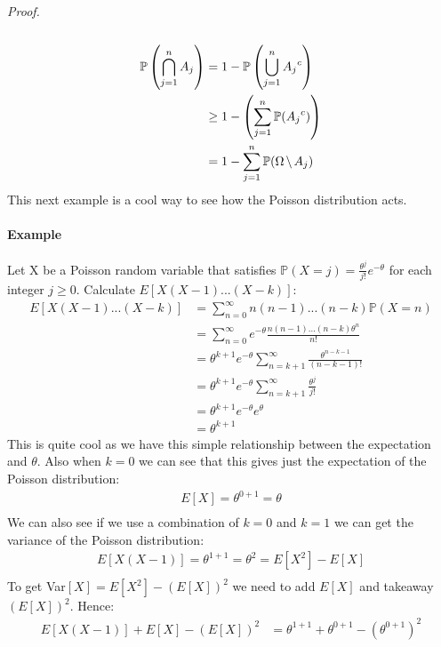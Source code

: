 \documentclass[,oneside]{article}
\begin{document}
\begin{enumerate}
\textit{Proof.}\\ \\
\begin{align*}
\mathbb{P} \left ( \bigcap_{j=1}^{n} A_j \right ) &= 1-\mathbb{P}\left ( \bigcup_{j=1}^{n} {A_j}^c \right )\\
&\geq 1- \left ( \sum_{j=1}^{n} \mathbb{P}({A_j}^c ) \right )\\
&= 1-  \sum_{j=1}^{n}   \mathbb{P}( \Omega \hspace{0.05cm} \backslash \hspace{0.05cm} A_j )\\
\end{align*}
This next example is a cool way to see how the Poisson distribution acts. \\ \\
\textbf{Example}\\ \\
Let X be a Poisson random variable that satisfies $\mathbb{P}(X=j)=\frac{\theta^j}{j!}e^{-\theta}$ for each integer $j \geq 0$. Calculate $E[X(X-1)...(X-k)]$:
\begin{align*}
E[X(X-1)...(X-k)]&=\sum_{n=0}^{\infty}n(n-1)...(n-k)\mathbb{P}(X=n)\\
&= \sum_{n=0}^{\infty}e^{-\theta}\frac{n(n-1)...(n-k)\theta^n}{n!}\\
&= \theta^{k+1} e^{-\theta} \sum_{n=k+1}^{\infty}\frac{\theta^{n-k-1}}{(n-k-1)!}\\
&= \theta^{k+1} e^{-\theta}\sum_{n=k+1}^{\infty} \frac{\theta^j}{j!}\\
&= \theta^{k+1} e^{-\theta} e^\theta \\
&= \theta^{k+1}
\end{align*}
This is quite cool as we have this simple relationship between the expectation and $\theta$. Also when $k=0$ we can see that this gives just the expectation of the Poisson distribution:
\begin{align*}
E[X]=\theta^{0+1}=\theta\\
\end{align*}
We can also see if we use a combination of $k=0$ and $k=1$ we can get the variance of the Poisson distribution:
\begin{align*}
E[X(X-1)]=\theta^{1+1}=\theta^2=E[X^2]-E[X]\\
\end{align*}
To get Var$[X]=E[X^2]-(E[X])^2$ we need to add $E[X]$ and takeaway $(E[X])^2$. Hence:
\begin{align*}
E[X(X-1)]+E[X]-(E[X])^2&=\theta^{1+1}+\theta^{0+1}-(\theta^{0+1})^2\\

\end{align*}
\end{enumerate}
\end{document}
